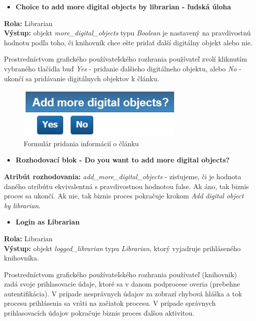 \documentclass[10pt,oneside,slovak,a4paper]{article}
\begin{document}
\begin{itemize}
\item \textbf{Choice to add more digital objects by librarian
 - ľudská úloha}
\end{itemize}

\textbf{Rola:} Librarian\\
\textbf{Výstup:} objekt \textit{more\_digital\_objects} typu \textit{Boolean} je nastavený na pravdivostnú hodnotu podľa toho, či knihovník chce ešte pridať ďalší digitálny objekt alebo nie.

Prostredníctvom grafického používateľského rozhrania používateľ zvolí kliknutím vybraného tlačidla buď \textit{Yes} - pridanie ďalšieho digitálneho objektu, alebo \textit{No} - ukončí sa pridávanie digitálnych objektov k článku.

\begin{figure} [H]
\centering
\includegraphics[scale=0.4]{forms/formDigitalObjects.jpg} 
\caption{Formulár pridania informácií o článku}
\end{figure}

\begin{itemize}
\item \textbf{Rozhodovací blok - Do you want to add more digital objects?}
\end{itemize}

\textbf{Atribút rozhodovania:} \textit{add\_more\_digital\_objects} - zisťujeme, či je hodnota daného atribútu ekvivalentná s pravdivostnou hodnotou false. Ak áno, tak biznis proces sa ukončí. Ak nie, tak biznis proces pokračuje krokom \textit{Add digital object by librarian}.



\begin{itemize}
\item \textbf{Login as Librarian}
\end{itemize}

\textbf{Rola:} Librarian\\
\textbf{Výstup:} objekt \textit{logged\_librarian} typu \textit{Librarian}, ktorý vyjadruje prihláseného knihovníka.

Prostredníctvom grafického používateľského rozhrania používateľ (knihovník) zadá svoje prihlasovacie údaje, ktoré sa v danom podprocese overia (prebehne autentifikácia). V prípade nesprávnych údajov za zobrazí chybová hláška a tok procesu prihlásenia sa vráti na začiatok procesu. V prípade správnych prihlasovacích údajov pokračuje biznis proces ďalšou aktivitou.
\end{document}
